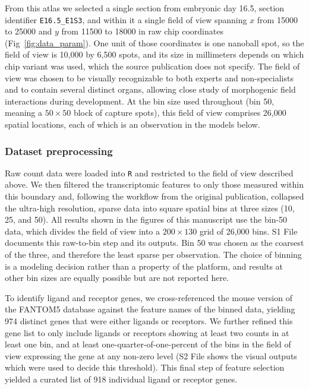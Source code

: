 \documentclass[10pt,letterpaper]{article}
\begin{document}
From this atlas we selected a single section from embryonic day 16.5, section identifier \texttt{E16.5\_E1S3}, and within it a single field of view spanning $x$ from 15000 to 25000 and $y$ from 11500 to 18000 in raw chip coordinates (Fig~\ref{fig:data_param}). One unit of those coordinates is one nanoball spot, so the field of view is 10,000 by 6,500 spots, and its size in millimeters depends on which chip variant was used, which the source publication does not specify. The field of view was chosen to be visually recognizable to both experts and non-specialists and to contain several distinct organs, allowing close study of morphogenic field interactions during development. At the bin size used throughout (bin 50, meaning a $50\times50$ block of capture spots), this field of view comprises 26,000 spatial locations, each of which is an observation in the models below.

\subsubsection*{Dataset preprocessing}

Raw count data were loaded into \texttt{R} and restricted to the field of view described above. We then filtered the transcriptomic features to only those measured within this boundary and, following the workflow from the original publication, collapsed the ultra-high resolution, sparse data into square spatial bins at three sizes (10, 25, and 50). All results shown in the figures of this manuscript use the bin-50 data, which divides the field of view into a $200\times130$ grid of 26,000 bins. S1 File documents this raw-to-bin step and its outputs. Bin 50 was chosen as the coarsest of the three, and therefore the least sparse per observation. The choice of binning is a modeling decision rather than a property of the platform, and results at other bin sizes are equally possible but are not reported here.

To identify ligand and receptor genes, we cross-referenced the mouse version of the FANTOM5 database \cite{Ramilowski2015} against the feature names of the binned data, yielding 974 distinct genes that were either ligands or receptors. We further refined this gene list to only include ligands or receptors showing at least two counts in at least one bin, and at least one-quarter-of-one-percent of the bins in the field of view expressing the gene at any non-zero level (S2 File shows the visual outputs which were used to decide this threshold). This final step of feature selection yielded a curated list of 918 individual ligand or receptor genes.
\end{document}
